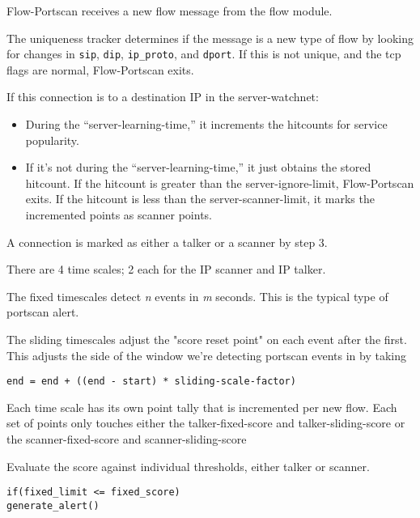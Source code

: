 \documentclass[english]{report}
\newcounter{slistnum}
\newenvironment{slist}
{ \begin{list}{ {\bf \arabic{slistnum}.} }{\usecounter{slistnum} } }
{ \end{list} }
\begin{document}
\begin{slist}
\item Flow-Portscan receives a new flow message from the flow module.
\item The uniqueness tracker determines if the message is a new type of flow by
looking for changes in \texttt{sip}, \texttt{dip}, \texttt{ip\_proto}, and \texttt{dport}.  
If this is not unique,
and the tcp flags are normal, Flow-Portscan exits.
\item If this connection is to a destination IP in the server-watchnet:
\begin{itemize}
	\item During the ``server-learning-time,'' it increments the hitcounts for service
popularity. 

	\item If it's not during the ``server-learning-time,'' it just obtains the stored hitcount.  If the hitcount is
      greater than the server-ignore-limit, Flow-Portscan exits.  If the hitcount is less than the
      server-scanner-limit, it marks the incremented points as scanner points.
\end{itemize}
\item A connection is marked as either a talker or a scanner by step 3.

There are 4 time scales; 2 each for the IP scanner and IP talker.

The fixed timescales detect \emph{n} events in \emph{m} seconds.  This is the typical type of
portscan alert.

The sliding timescales adjust the "score reset point" on each event after the
first.  This adjusts the side of the window we're detecting portscan events in
by taking

\begin{verbatim} 
end = end + ((end - start) * sliding-scale-factor)
\end{verbatim}

Each time scale has its own point tally that is incremented per new flow.
Each set of points only touches either the talker-fixed-score and talker-sliding-score or the scanner-fixed-score and scanner-sliding-score

\item Evaluate the score against individual thresholds, either talker or
scanner. 

\begin{verbatim}
if(fixed_limit <= fixed_score)
generate_alert()
\end{verbatim}
\end{slist}
\end{document}
